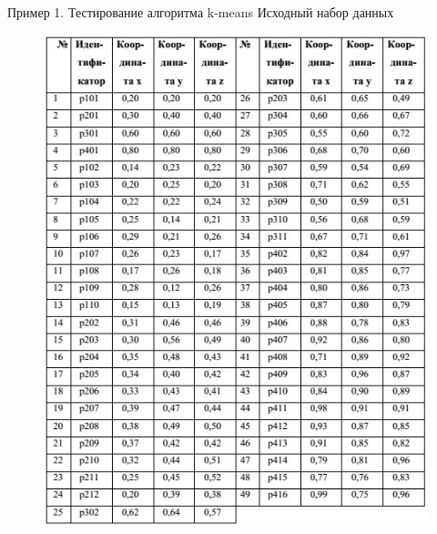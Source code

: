 \documentclass{beamer}
\begin{document}
\begin{frame}{Пример 1. Тестирование алгоритма k-means}
Исходный набор данных
\begin{figure}[h]
\centering
\includegraphics[scale=0.4]{images/lec07-pic32.png}
\end{figure}
\end{frame}
\end{document}
